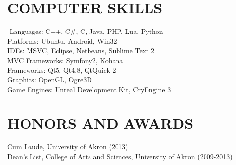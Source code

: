 \documentclass{res}
\begin{document}
\begin{resume}
\section{COMPUTER SKILLS}
  \vspace{-0.1in}
  \begin{tabbing}
  \hspace{2.3in} \= \kill
  Languages: \>  C++, C\#, C, Java, PHP, Lua, Python \\
  Platforms: \> Ubuntu, Android, Win32 \\
  IDEs: \> MSVC, Eclipse, Netbeans, Sublime Text 2 \\
  MVC Frameworks: \> Symfony2, Kohana \\
  Frameworks: \> Qt5, Qt4.8, QtQuick 2 \\
  Graphics: \> OpenGL, Ogre3D \\
  Game Engines: \> Unreal Development Kit, CryEngine 3
  \end{tabbing}

\section{HONORS AND AWARDS}          
    Cum Laude, University of Akron (2013) \\
    Dean's List, College of Arts and Sciences, University of Akron (2009-2013)         

\end{resume}
\end{document}
